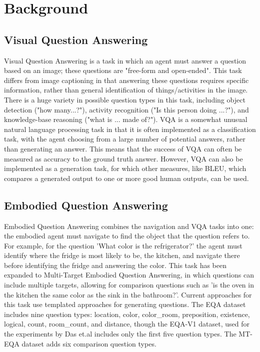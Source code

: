 \chapter{Background}
\section{Visual Question Answering}
Visual Question Answering is a task in which an agent must answer a question based on an image; these questions are "free-form and open-ended"\cite{vqa_2015}. This task differs from image captioning in that answering these questions requires specific information, rather than general identification of things/activities in the image. There is a huge variety in possible question types in this task, including object detection ("how many...?"), activity recognition ("Is this person doing ...?"), and knowledge-base reasoning ("what is ... made of?"). 
VQA is a somewhat unusual natural language processing task in that it is often implemented as a classification task, with the agent choosing from a large number of potential answers, rather than generating an answer. This means that the success of VQA can often be measured as accuracy to the ground truth answer. However, VQA can also be implemented as a generation task, for which other measures, like BLEU, which compares a generated output to one or more good human outputs, can be used\cite{bleu}.
\section{Embodied Question Answering}
Embodied Question Answering combines the navigation and VQA tasks into one: the embodied agent must navigate to find the object that the question refers to\cite{embodiedqa}. For example, for the question 'What color is the refrigerator?' the agent must identify where the fridge is most likely to be, the kitchen, and navigate there before identifying the fridge and answering the color. This task has been expanded to Multi-Target Embodied Question Answering, in which questions can include multiple targets, allowing for comparison questions such as 'is the oven in the kitchen the same color as the sink in the bathroom?'\cite{eqa_multitarget}. Current approaches for this task use templated approaches for generating questions. The EQA dataset includes nine question types: location, color, color\_room, preposition, existence, logical, count, room\_count, and distance, though the EQA-V1 dataset, used for the experiments by Das et.al includes only the first five question types\cite{embodiedqa}. The MT-EQA dataset adds six comparison question types\cite{eqa_multitarget}.

